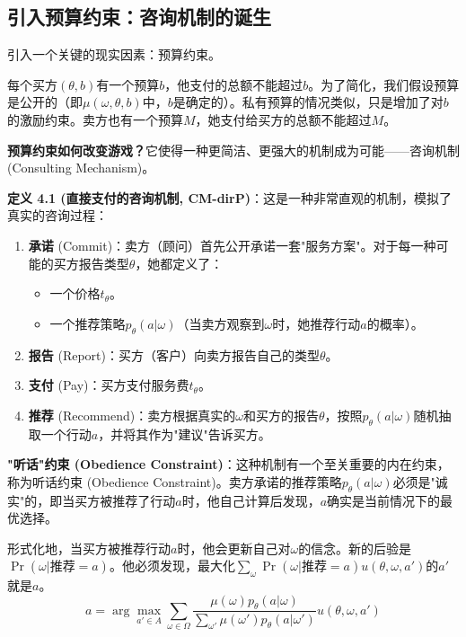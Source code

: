 \subsection{引入预算约束：咨询机制的诞生}

引入一个关键的现实因素：预算约束。

每个买方$(\theta,b)$有一个预算$b$，他支付的总额不能超过$b$。为了简化，我们假设预算是公开的（即$\mu(\omega,\theta,b)$中，$b$是确定的）。私有预算的情况类似，只是增加了对$b$的激励约束。卖方也有一个预算$M$，她支付给买方的总额不能超过$M$。

\textbf{预算约束如何改变游戏？}它使得一种更简洁、更强大的机制成为可能——咨询机制 (Consulting Mechanism)。

\textbf{定义 4.1 (直接支付的咨询机制, CM-dirP)}：这是一种非常直观的机制，模拟了真实的咨询过程：

\begin{enumerate}
    \item \textbf{承诺} (Commit)：卖方（顾问）首先公开承诺一套"服务方案"。对于每一种可能的买方报告类型$\theta$，她都定义了：
       \begin{itemize}
         \item 一个价格$t_\theta$。
         \item 一个推荐策略$p_\theta(a|\omega)$（当卖方观察到$\omega$时，她推荐行动$a$的概率）。
       \end{itemize}
    \item \textbf{报告} (Report)：买方（客户）向卖方报告自己的类型$\theta$。
    \item \textbf{支付} (Pay)：买方支付服务费$t_\theta$。
    \item \textbf{推荐} (Recommend)：卖方根据真实的$\omega$和买方的报告$\theta$，按照$p_\theta(a|\omega)$随机抽取一个行动$a$，并将其作为"建议"告诉买方。
\end{enumerate}

\textbf{"听话"约束 (Obedience Constraint)}：这种机制有一个至关重要的内在约束，称为听话约束 (Obedience Constraint)。卖方承诺的推荐策略$p_\theta(a|\omega)$必须是"诚实"的，即当买方被推荐了行动$a$时，他自己计算后发现，$a$确实是当前情况下的最优选择。

形式化地，当买方被推荐行动$a$时，他会更新自己对$\omega$的信念。新的后验是$\Pr(\omega|\text{推荐}=a)$。他必须发现，最大化$\sum\limits_{\omega}\Pr(\omega | \text{推荐}=a)u(\theta,\omega,a')$的$a'$就是$a$。
$$a = \arg \max_{a' \in A}\sum\limits_{\omega\in\Omega}\frac{\mu(\omega)p_{\theta}(a|\omega)}{\sum_{\omega'}\mu(\omega')p_{\theta}(a|\omega')}u(\theta,\omega,a')$$

